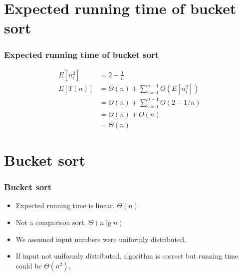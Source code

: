 \documentclass{beamer}
\newcommand{\bi}{\begin{itemize}}
\newcommand{\ei}{\end{itemize}}
\newcommand{\sect}[1]{
\section{#1}
\begin{frame}[fragile]\frametitle{#1}
}
\begin{document}
\sect{Expected running time of bucket sort}
\begin{align*}
  E[n_i^2]  &= 2 - \frac{1}{n}
  \\
  E[T(n)] &= \Theta(n) + \sum_{i=0}^{n-1}O(E[n_i^2])
  \\
  &= \Theta(n) + \sum_{i=0}^{n-1}O(2-1/n)
  \\
  &= \Theta(n) + O(n)\\
  &= \Theta(n)
\end{align*}
\end{frame}

\sect{Bucket sort}
\bi
\item
  Expected running time is linear.  $\Theta(n)$
\item
  Not a comparison sort. $\Theta(n\lg n)$
\item
  We assumed input numbers were uniformly distributed.
\item
  If input not uniformly distributed, algorithm is correct but
  running time could be $\Theta(n^2)$.
  \ei
\end{frame}
\end{document}
